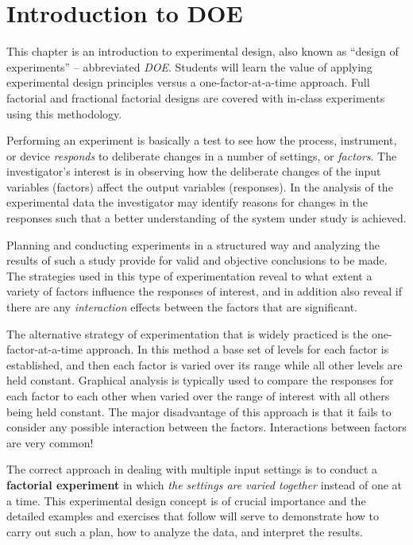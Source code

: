 \chapter{Introduction to DOE}
This chapter is an introduction to experimental design, also known as ``design of experiments'' -- abbreviated \textit{DOE}. Students will learn the value of applying experimental design principles versus a one-factor-at-a-time approach. Full factorial and fractional factorial designs are covered with in-class experiments using this methodology.

Performing an experiment is basically a test to see how the process, instrument, or device \textit{responds} to deliberate changes in a number of settings, or \textit{factors}.  The investigator's interest is in observing how the deliberate changes of the input variables (factors) affect the output variables (responses).  In the analysis of the experimental data the investigator may identify reasons for changes in the responses such that a better understanding of the system under study is achieved.

Planning and conducting experiments in a structured way and analyzing the results of such a study provide for valid and objective conclusions to be made.  The strategies used in this type of experimentation reveal to what extent a variety of factors influence the responses of interest, and in addition also reveal if there are any \textit{interaction}  effects between the factors that are significant.

The alternative strategy of experimentation that is widely practiced is the one-factor-at-a-time approach. In this method a base set of levels for each factor is established, and then each factor is varied over its range while all other levels are held constant. Graphical analysis is typically used to compare the responses for each factor to each other when varied over the range of interest with all others being held constant. The major disadvantage of this approach is that it fails to consider any possible interaction between the factors.  Interactions between factors are very common!

The correct approach in dealing with multiple input settings is to conduct a \textbf{factorial experiment} in which \textit{the settings are varied together} instead of one at a time.  This experimental design concept is of crucial importance and the detailed examples and exercises that follow will serve to demonstrate how to carry out such a plan, how to analyze the data, and interpret the results.


